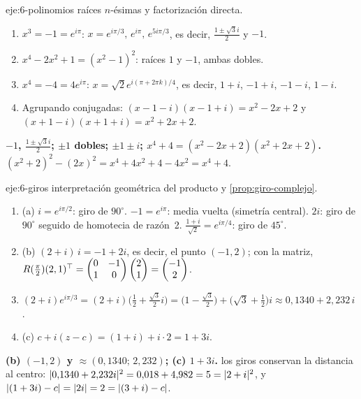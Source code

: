 \begin{solucion}{eje:6-polinomios}
\planteamiento raíces $n$-ésimas y factorización directa.
\pasos
\begin{enumerate}[label=\arabic*.]
  \item $x^{3}=-1=e^{i\pi}$: $x=e^{i\pi/3},\,e^{i\pi},\,e^{5i\pi/3}$, es decir, $\frac{1\pm\sqrt3i}{2}$ y $-1$.
  \item $x^{4}-2x^{2}+1=(x^{2}-1)^{2}$: raíces $1$ y $-1$, ambas dobles.
  \item $x^{4}=-4=4e^{i\pi}$: $x=\sqrt2e^{i(\pi+2\pi k)/4}$, es decir, $1+i$, $-1+i$, $-1-i$, $1-i$.
  \item Agrupando conjugadas: $(x-1-i)(x-1+i)=x^{2}-2x+2$ y $(x+1-i)(x+1+i)=x^{2}+2x+2$.
\end{enumerate}
\resultado \textbf{$-1$, $\frac{1\pm\sqrt3i}{2}$; $\pm1$ dobles; $\pm1\pm i$; $x^{4}+4=(x^{2}-2x+2)(x^{2}+2x+2)$.}
\comprobacion $(x^{2}+2)^{2}-(2x)^{2}=x^{4}+4x^{2}+4-4x^{2}=x^{4}+4$.
\end{solucion}

\begin{solucion}{eje:6-giros}
\planteamiento interpretación geométrica del producto y \cref{prop:giro-complejo}.
\pasos
\begin{enumerate}[label=\arabic*.]
  \item (a) $i=e^{i\pi/2}$: giro de $90^{\circ}$. $-1=e^{i\pi}$: media vuelta (simetría central). $2i$: giro de $90^{\circ}$ seguido de homotecia de razón~2. $\frac{1+i}{\sqrt2}=e^{i\pi/4}$: giro de $45^{\circ}$.
  \item (b) $(2+i)\,i=-1+2i$, es decir, el punto $(-1,2)$; con la matriz, $R(\frac{\pi}{2})(2,1)^{\top}=\begin{pmatrix}0&-1\\1&0\end{pmatrix}\begin{pmatrix}2\\1\end{pmatrix}=\begin{pmatrix}-1\\2\end{pmatrix}$.
  \item $(2+i)e^{i\pi/3}=(2+i)\bigl(\frac12+\frac{\sqrt3}{2}i\bigr)=\bigl(1-\frac{\sqrt3}{2}\bigr)+\bigl(\sqrt3+\frac12\bigr)i\approx0{,}1340+2{,}232\,i$.
  \item (c) $c+i(z-c)=(1+i)+i\cdot2=1+3i$.
\end{enumerate}
\resultado \textbf{(b) $(-1,2)$ y $\approx(0{,}1340;\,2{,}232)$; (c) $1+3i$.}
\comprobacion los giros conservan la distancia al centro: $\lvert0{,}1340+2{,}232i\rvert^{2}=0{,}018+4{,}982=5=\lvert2+i\rvert^{2}$, y $\lvert(1+3i)-c\rvert=\lvert2i\rvert=2=\lvert(3+i)-c\rvert$.
\end{solucion}

